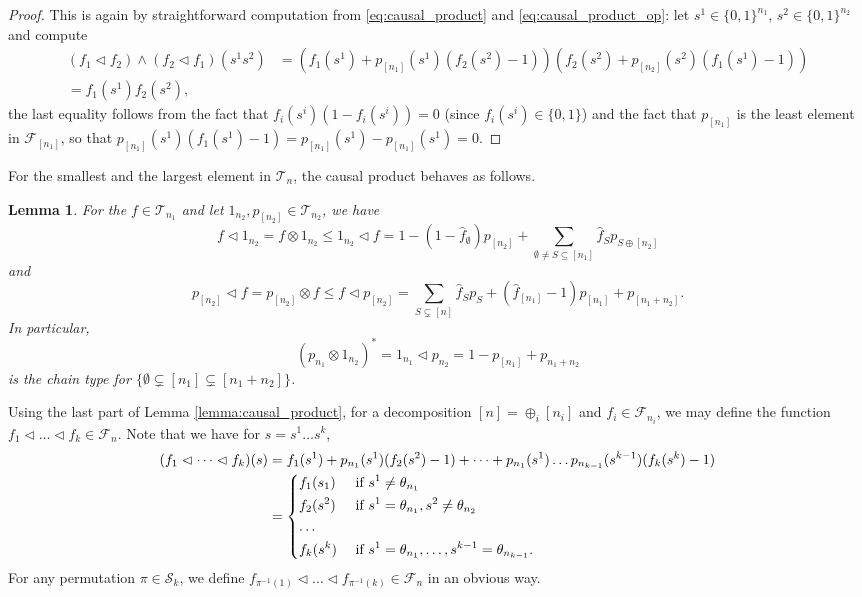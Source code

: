 \documentclass[12pt]{article}
\newtheorem{lemma}{Lemma}
\theoremstyle{definition}
\theoremstyle{remark}
\def\Te{\mathcal T}
\def\Fe{\mathcal F}
\def\permut{\mathscr{S}}
\def\vtl{\vartriangleleft}
\begin{document}
\begin{proof} This is again by straightforward computation from \eqref{eq:causal_product}
and \eqref{eq:causal_product_op}: let
$s^1\in \{0,1\}^{n_1}$, $s^2\in \{0,1\}^{n_2}$ and compute
\begin{align*}
(f_1\vtl f_2)\wedge (f_2\vtl
f_1)(s^1s^2)&=\left(f_1(s^1)+p_{[n_1]}(s^1)(f_2(s^2)-1)\right)\left(f_2(s^2)+p_{[n_2]}(s^2)(f_1(s^1)-1)\right)\\
=f_1(s^1)f_2(s^2),
\end{align*}
the last equality follows from the fact that $f_i(s^i)(1-f_i(s^i))=0$ (since $f_i(s^i)\in
\{0,1\}$) and the fact that $p_{[n_1]}$ is the least element in $\Fe_{[n_1]}$, so that
$p_{[n_1]}(s^1)(f_1(s^1)-1)=p_{[n_1]}(s^1)-p_{[n_1]}(s^1)=0$. 

\end{proof}

For the smallest and the largest element in $\Te_n$, the causal product behaves as
follows.
\begin{lemma}\label{lemma:onechain_causal}
For the  $f\in \Te_{n_1}$ and let $1_{n_2}, p_{[n_2]}\in \Te_{n_2}$, we have
\[
f\vtl 1_{n_2}= f\otimes 1_{n_2}\le 1_{n_2}\vtl f =1-(1-\hat
f_\emptyset)p_{[n_2]}+\sum_{\emptyset \ne S\subseteq [n_1]} \hat f_S p_{S\oplus [n_2]}
\]
and
\[
p_{[n_2]} \vtl f=p_{[n_2]}\otimes f \le f\vtl p_{[n_2]}=\sum_{S\subsetneq [n]} \hat
f_Sp_S+(\hat f_{[n_1]}-1)p_{[n_1]}+p_{[n_1+n_2]}.
\]
In particular,
\[
(p_{n_1}\otimes 1_{n_2})^*=1_{n_1}\vtl p_{n_2}=1-p_{[n_1]}+p_{n_1+n_2}
\]
is the chain type for $\{\emptyset\subsetneq [n_1]\subsetneq [n_1+n_2]\}$.
\end{lemma}








Using the last part of Lemma \ref{lemma:causal_product},
for a decomposition $[n]=\oplus_i[n_i]$ and $f_i\in \Fe_{n_i}$,  we may define the function $f_1\vtl\dots \vtl f_k\in
\Fe_{n}$. Note that we have for $s=s^1\dots s^k$, 
\begin{align*}
(f_1\vtl \dots\vtl f_k)(s)&=f_1(s^1)+p_{n_1}(s^1)(f_2(s^2)-1)+\dots + p_{n_1}(s^1)\dots
p_{n_{k-1}}(s^{k-1})(f_k(s^k)-1)\\
&= \begin{dcases} f_1(s_1) & \text{ if } s^1\ne \theta_{n_1}\\
f_2(s^2) & \text{ if } s^1=\theta_{n_1}, s^2\ne \theta_{n_2}\\
\dots & \\
f_k(s^k) & \text{ if } s^1=\theta_{n_1},\dots,  s^{k-1}=\theta_{n_{k-1}}.
\end{dcases}
\end{align*}
For any permutation $\pi\in \permut_k$, we define  $f_{\pi^{-1}(1)}\vtl \dots \vtl
f_{\pi^{-1}(k)}\in \Fe_n$ in an obvious way.
\end{document}
